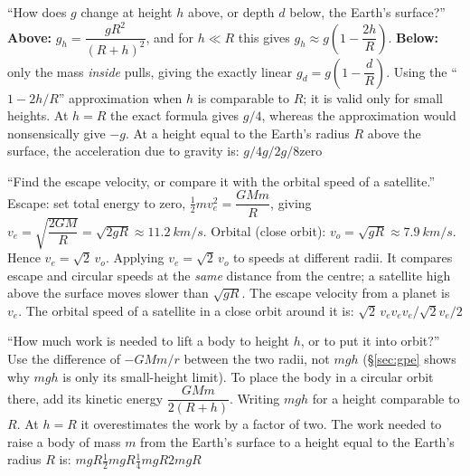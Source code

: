 {``How does $g$ change at height $h$ above, or depth $d$ below, the Earth's surface?''}
{\textbf{Above:} $g_h=\dfrac{gR^2}{(R+h)^2}$, and for $h\ll R$ this gives $g_h\approx g\left(1-\dfrac{2h}{R}\right)$.
\textbf{Below:} only the mass \emph{inside} pulls, giving the exactly linear
$g_d=g\left(1-\dfrac{d}{R}\right)$.}
{Using the ``$1-2h/R$'' approximation when $h$ is comparable to $R$; it is valid only for small
heights. At $h=R$ the exact formula gives $g/4$, whereas the approximation would nonsensically give
$-g$.}
{At a height equal to the Earth's radius $R$ above the surface, the acceleration due to gravity is:}
{$g/4$}{$g/2$}{$g/8$}{zero}

{``Find the escape velocity, or compare it with the orbital speed of a satellite.''}
{Escape: set total energy to zero, $\tfrac{1}{2}mv_e^2=\dfrac{GMm}{R}$, giving
$v_e=\sqrt{\dfrac{2GM}{R}}=\sqrt{2gR}\approx\SI{11.2}{km/s}$. Orbital (close orbit):
$v_o=\sqrt{gR}\approx\SI{7.9}{km/s}$. Hence $\boxed{v_e=\sqrt2\,v_o}$.}
{Applying $v_e=\sqrt2\,v_o$ to speeds at different radii. It compares escape and circular speeds at the
\emph{same} distance from the centre; a satellite high above the surface moves slower than $\sqrt{gR}$.}
{The escape velocity from a planet is $v_e$. The orbital speed of a satellite in a close orbit around it
is:}
{$\sqrt2\,v_e$}{$v_e$}{$v_e/\sqrt2$}{$v_e/2$}

{``How much work is needed to lift a body to height $h$, or to put it into orbit?''}
{Use the difference of $-GMm/r$ between the two radii, not $mgh$ (\S\ref{sec:gpe} shows why $mgh$ is
only its small-height limit). To place the body in a circular orbit there, add its kinetic energy
$\dfrac{GMm}{2(R+h)}$.}
{Writing $mgh$ for a height comparable to $R$. At $h=R$ it overestimates the work by a factor of two.}
{The work needed to raise a body of mass $m$ from the Earth's surface to a height equal to the Earth's
radius $R$ is:}
{$mgR$}{$\tfrac12mgR$}{$\tfrac14mgR$}{$2mgR$}

